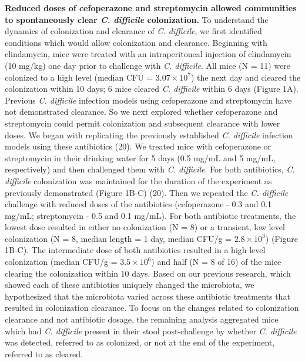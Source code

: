 \documentclass[11pt,]{article}
\begin{document}
\textbf{Reduced doses of cefoperazone and streptomycin allowed
communities to spontaneously clear \emph{C. difficile} colonization.} To
understand the dynamics of colonization and clearance of \emph{C.
difficile}, we first identified conditions which would allow
colonization and clearance. Beginning with clindamycin, mice were
treated with an intraperitoneal injection of clindamycin (10 mg/kg) one
day prior to challenge with \emph{C. difficile}. All mice (N = 11) were
colonized to a high level (median CFU = \(3.07 \times 10^7\)) the next
day and cleared the colonization within 10 days; 6 mice cleared \emph{C.
difficile} within 6 days (Figure 1A). Previous \emph{C. difficile}
infection models using cefoperazone and streptomycin have not
demonstrated clearance. So we next explored whether cefoperazone and
streptomycin could permit colonization and subsequent clearance with
lower doses. We began with replicating the previously established
\emph{C. difficile} infection models using these antibiotics (20). We
treated mice with cefoperazone or streptomycin in their drinking water
for 5 days (0.5 mg/mL and 5 mg/mL, respectively) and then challenged
them with \emph{C. difficile}. For both antibiotics, \emph{C. difficile}
colonization was maintained for the duration of the experiment as
previously demonstrated (Figure 1B-C) (20). Then we repeated the
\emph{C. difficile} challenge with reduced doses of the antibiotics
(cefoperazone - 0.3 and 0.1 mg/mL; streptomycin - 0.5 and 0.1 mg/mL).
For both antibiotic treatments, the lowest dose resulted in either no
colonization (N = 8) or a transient, low level colonization (N = 8,
median length = 1 day, median CFU/g = \(2.8 \times 10^3\)) (Figure
1B-C). The intermediate dose of both antibiotics resulted in a high
level colonization (median CFU/g = \(3.5 \times 10^6\)) and half (N = 8
of 16) of the mice clearing the colonization within 10 days. Based on
our previous research, which showed each of these antibiotics uniquely
changed the microbiota, we hypothesized that the microbiota varied
across these antibiotic treatments that resulted in colonization
clearance. To focus on the changes related to colonization clearance and
not antibiotic dosage, the remaining analysis aggregated mice which had
\emph{C. difficile} present in their stool post-challenge by whether
\emph{C. difficile} was detected, referred to as colonized, or not at
the end of the experiment, referred to as cleared.
\end{document}
